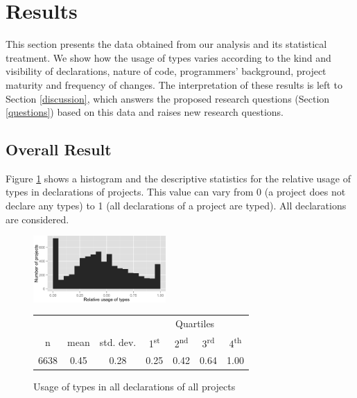 \documentclass[]{sigplanconf}
\newcommand{\ts}{\textsuperscript}
\begin{document}
%
%
\section{Results\label{results}}
This section presents the data obtained from our analysis and its statistical treatment.
We show how the usage of types varies according to the kind and visibility of declarations, nature of code, programmers' background, project maturity and frequency of changes.
The interpretation of these results is left to Section \ref{discussion}, which answers the proposed research questions (Section \ref{questions}) based on this data and raises new research questions.

\subsection{Overall Result\label{sec:results-overall}}

Figure \ref{fig:all_histogram_all} shows a histogram and the descriptive statistics for the relative usage of types in declarations of projects.
This value can vary from 0 (a project does not declare any types) to 1 (all declarations of a project are typed). 
All declarations are considered.

\begin{figure}[h]
\centering 
\includegraphics[width=0.45\textwidth]{../analysis/result/all/histograms/5_all_types.png} 

\vspace{0.3cm}
\small
\begin{tabular}{|c|c|c|cccc|}
\hline
{}		&  {}		&  {}			&  \multicolumn{4}{c|}{Quartiles}				\\
n		& mean	& std. dev.	& 1\ts{st}	& 2\ts{nd}	& 3\ts{rd}	& 4\ts{th}		\\
\hline
\hline
6638 	& 0.45	& 0.28		& 0.25	& 0.42		& 0.64	& 1.00		\\
\hline
\end{tabular}


\caption{Usage of types in all declarations of all projects}
\label{fig:all_histogram_all} 
\end{figure}
\end{document}
